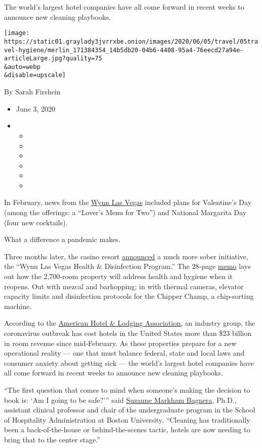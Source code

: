 The world's largest hotel companies have all come forward in recent
weeks to announce new cleaning playbooks.

\texttt{[image: https://static01.graylady3jvrrxbe.onion/images/2020/06/05/travel/05travel-hygiene/merlin\_171384354\_14b5db20-04b6-4408-95a4-76eecd27a94e-articleLarge.jpg?quality=75\\\&auto=webp\\\&disable=upscale]}

By Sarah Firshein

\begin{itemize}
\item
  June 3, 2020
\item
  \begin{itemize}
  \item
  \item
  \item
  \item
  \item
  \item
  \end{itemize}
\end{itemize}

In February, news from the \href{https://www.wynnlasvegas.com/}{Wynn Las
Vegas} included plans for Valentine's Day (among the offerings: a
``Lover's Menu for Two'') and National Margarita Day (four new
cocktails).

What a difference a pandemic makes.

Three months later, the casino resort
\href{https://www.visitwynn.com/documents/Wynn-Health-Plan.pdf}{announced}
a much more sober initiative, the ``Wynn Las Vegas Health \&
Disinfection Program.'' The 28-page
\href{https://www.visitwynn.com/documents/Wynn-Health-Plan.pdf}{memo}
lays out how the 2,700-room property will address health and hygiene
when it reopens. Out with mezcal and barhopping; in with thermal
cameras, elevator capacity limits and disinfection protocols for the
Chipper Champ, a chip-sorting machine.

According to the
\href{https://www.ahla.com/covid-19s-impact-hotel-industry}{American
Hotel \& Lodging Association,} an industry group, the coronavirus
outbreak has cost hotels in the United States more than \$23 billion in
room revenue since mid-February. As these properties prepare for a new
operational reality --- one that must balance federal, state and local
laws and consumer anxiety about getting sick --- the world's largest
hotel companies have all come forward in recent weeks to announce new
cleaning playbooks.

``The first question that comes to mind when someone's making the
decision to book is: `Am I going to be safe?''' said
\href{https://www.bu.edu/hospitality/profile/suzanne-markham-bagnera/}{Suzanne
Markham Bagnera}, Ph.D., assistant clinical professor and chair of the
undergraduate program in the School of Hospitality Administration at
Boston University. ``Cleaning has traditionally been a back-of-the-house
or behind-the-scenes tactic, hotels are now needing to bring that to the
center stage.''

